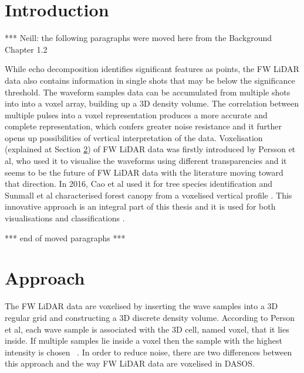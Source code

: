 \documentclass{subfiles}
\begin{document}
\section{Introduction}
	\par {\color{red} *** Neill: the following paragraphs were moved here from the Background Chapter 1.2}
		



	\par While echo decomposition identifies significant features as points, the FW LiDAR data also contains information in single shots that may be below the significance threshold. The waveform samples data can be accumulated from multiple shots into {\color{blue} into a voxel array, building up a 3D density volume. The correlation between multiple pulses into a voxel representation produces a more accurate and complete representation, which confers greater noise resistance and it further opens up possibilities of vertical interpretation of the data. Voxelisation (explained at Section \ref{sec:Vox:Approach}) of FW LiDAR data} was firstly introduced by Persson et al, who used it to visualise the waveforms using different transparencies \cite{Persson2005} and it seems to be the future of FW LiDAR data with the literature moving toward that direction. In 2016, Cao et al used it for tree species identification \cite{Cao2016} and Sunmall et al characterised forest canopy from a voxelised vertical profile \cite{Sumnall2016}. This innovative approach is an integral part of this thesis and it is used for both visualisations and classifications \cite{Miltiadou2014}\cite{Miltiadou2015}. 

	\par {\color{red} *** end of moved paragraphs *** }
		
		

	
\section{Approach}\label{sec:Vox:Approach}

\par The FW LiDAR data are voxelised by inserting the wave samples into a 3D regular grid and constructing a 3D discrete density volume. According to Person et al, each wave sample is associated with the 3D cell, named voxel, that it lies inside. If multiple samples lie inside a voxel then the sample with the highest intensity is chosen ~\cite{Persson2005}. In order to reduce noise, there are two differences between this approach and the way FW LiDAR data are voxelised in DASOS. 
\end{document}
